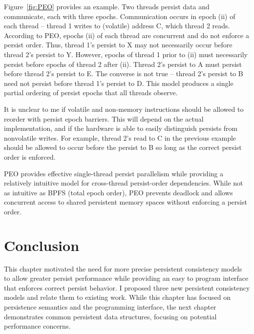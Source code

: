 Figure~\ref{fig:PEO} provides an example.
Two threads persist data and communicate, each with three epochs.
Communication occurs in epoch (ii) of each thread -- thread 1 writes to (volatile) address C, which thread 2 reads.
According to PEO, epochs (ii) of each thread are concurrent and do not enforce a persist order.
Thus, thread 1's persist to X may not necessarily occur before thread 2's persist to Y.
However, epochs of thread 1 prior to (ii) must necessarily persist before epochs of thread 2 after (ii).
Thread 2's persist to A must persist before thread 2's persist to E.
The converse is not true -- thread 2's persist to B need not persist before thread 1's persist to D.
This model produces a single partial ordering of persist epochs that all threads observe.

It is unclear to me if volatile and non-memory instructions should be allowed to reorder with persist epoch barriers.
This will depend on the actual implementation, and if the hardware is able to easily distinguish persists from nonvolatile writes.
For example, thread 2's read to C in the previous example should be allowed to occur before the persist to B so long as the correct persist order is enforced.

PEO provides effective single-thread persist parallelism while providing a relatively intuitive model for cross-thread persist-order dependencies.
While not as intuitive as BPFS (total epoch order), PEO prevents deadlock and allows concurrent access to shared persistent memory spaces without enforcing a persist order.

\section{Conclusion}
\label{sec:PMC:Conclusion}

This chapter motivated the need for more precise persistent consistency models to allow greater persist performance while providing an easy to program interface that enforces correct persist behavior.
I proposed three new persistent consistency models and relate them to existing work.
While this chapter has focused on persistence semantics and the programming interface, the next chapter demonstrates common persistent data structures, focusing on potential performance concerns.
